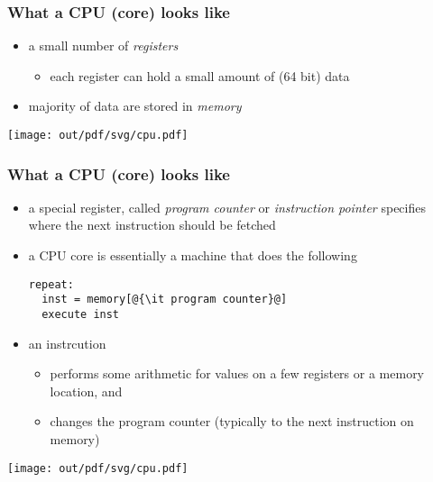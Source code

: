 \documentclass[12pt,dvipdfmx]{beamer}
\begin{document}
\begin{frame}
  \frametitle{What a CPU (core) looks like}
  \begin{itemize}
  \item a small number of {\it registers}
    \begin{itemize}
    \item each register can hold a small amount of (64 bit) data
    \end{itemize}
  \item majority of data are stored in {\it memory}
  \end{itemize}

  \begin{center}
    \texttt{[image: out/pdf/svg/cpu.pdf]}
  \end{center}
\end{frame}

\begin{frame}[fragile]
  \frametitle{What a CPU (core) looks like}
  \begin{itemize}
  \item a special register, called {\it program counter} or {\it instruction pointer} specifies where the next instruction should be fetched
  \item a CPU core is essentially a machine that does the following
    \begin{lstlisting}
repeat:
  inst = memory[@{\it program counter}@]
  execute inst
\end{lstlisting}
  \item an instrcution 
    \begin{itemize}
    \item performs some arithmetic for values on a few registers or a memory location, and 
    \item changes the program counter (typically to the next instruction on memory)
    \end{itemize}
  \end{itemize}

  \begin{center}
    \texttt{[image: out/pdf/svg/cpu.pdf]}
  \end{center}
\end{frame}
\end{document}
